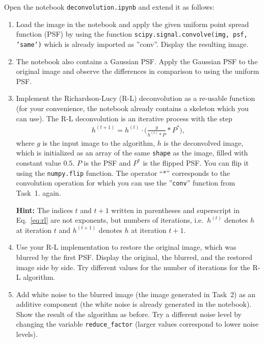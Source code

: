 \documentclass[12pt,a4paper]{article}
\begin{document}

\noindent
Open the notebook \texttt{deconvolution.ipynb} and extend it as follows:

\begin{enumerate}
    \item Load the image in the notebook and apply the given uniform point spread function (PSF) by using the function \texttt{scipy.signal.convolve(img, psf, 'same')} which is already imported as ''conv''. Display the resulting image.
    \item The notebook also contains a Gaussian PSF. Apply the Gaussian PSF to the original image and observe the differences in comparison to using the uniform PSF.
    \item Implement the Richardson-Lucy (R-L) deconvolution as a re-usable function (for your convenience, the notebook already contains a skeleton which you can use). The R-L deconvolution is an iterative process with the step
    \begin{gather}
        h^{(t+1)} = h^{(t)} \cdot \Big(\frac{g}{h^{(t)} \ast P} \ast P^*\Big),
        \label{eq:rl}
    \end{gather}
    where $g$ is the input image to the algorithm, $h$ is the deconvolved image, which is initialized as an array of the same \texttt{shape} as the image, filled with constant value $0.5$. $P$ is the PSF and $P^*$ is the flipped PSF. You can flip it using the \texttt{numpy.flip} function. The operator ``$\ast$'' corresponds to the convolution operation for which you can use the ''\texttt{conv}'' function from Task~1. again.
    \par\textbf{Hint:} The indices $t$ and $t+1$ written in parentheses and superscript in Eq.~\eqref{eq:rl} are not exponents, but numbers of iterations, i.e.\ $h^{(t)}$ denotes $h$ at iteration $t$ and $h^{(t+1)}$ denotes $h$ at iteration $t+1$.
    \item Use your R-L implementation to restore the original image, which was blurred by the first PSF. Display the original, the blurred, and the restored image side by side. Try different values for the number of iterations for the R-L algorithm.
    \item Add white noise to the blurred image (the image generated in Task~2) as an additive component (the white noise is already generated in the notebook). Show the result of the algorithm as before. Try a different noise level by changing the variable \texttt{reduce\_factor} (larger values correspond to lower noise levels).

\end{enumerate}
\end{document}
